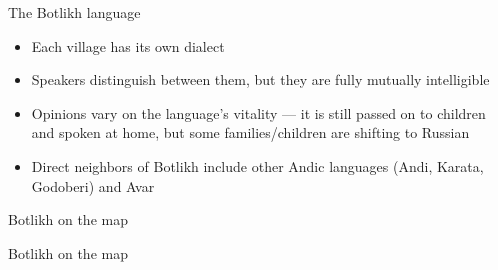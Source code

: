\begin{frame}{The Botlikh language}
\begin{itemize}
    \item Each village has its own dialect %
    \item Speakers distinguish between them, but they are fully mutually intelligible
    \item Opinions vary on the language's vitality --- it is still passed on to children and spoken at home, but some families/children are shifting to Russian
    \item Direct neighbors of Botlikh include other Andic languages (Andi, Karata, Godoberi) and Avar %
\end{itemize}
\end{frame}

\begin{frame}{Botlikh on the map}
\begin{figure}[h]
\centering
{}
\end{figure}
\end{frame}

\begin{frame}{Botlikh on the map}
\begin{figure}[h]
\centering
{}
\end{figure}
\end{frame}

